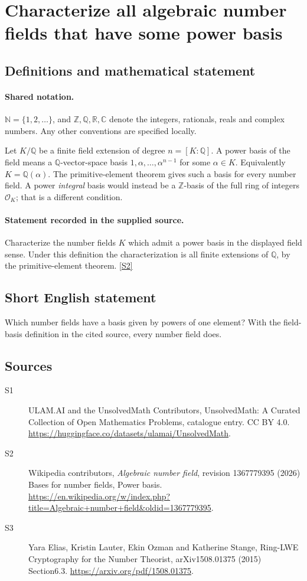 \documentclass[11pt]{article}
\newcommand{\sref}[2]{\hyperlink{source:#1:#2}{[S#2]}}
\begin{document}
\section{Characterize all algebraic number fields that have some power basis}\label{statement}

\subsection{Definitions and mathematical statement}

\paragraph{Shared notation.}$\mathbb N=\{1,2,\ldots\}$, and $\mathbb Z,\mathbb Q,\mathbb R,\mathbb C$ denote the integers, rationals, reals and complex numbers. Any other conventions are specified locally.


Let $K/\mathbb Q$ be a finite field extension of degree $n=[K:\mathbb Q]$. A power basis of the field means a $\mathbb Q$-vector-space basis $1,\alpha,\ldots,\alpha^{n-1}$ for some $\alpha\in K$. Equivalently $K=\mathbb Q(\alpha)$. The primitive-element theorem gives such a basis for every number field. A power \emph{integral} basis would instead be a $\mathbb Z$-basis of the full ring of integers $\mathcal O_K$; that is a different condition.
\paragraph{Statement recorded in the supplied source.}
Characterize the number fields $K$ which admit a power basis in the displayed field sense. Under this definition the characterization is all finite extensions of $\mathbb Q$, by the primitive-element theorem. \sref{statement}{2}
\subsection{Short English statement}
Which number fields have a basis given by powers of one element? With the field-basis definition in the cited source, every number field does.
\subsection{Sources}
\begin{description}
\item[\hypertarget{source:statement:1}{S1}] ULAM.AI and the UnsolvedMath Contributors, UnsolvedMath: A Curated Collection of Open Mathematics Problems, catalogue entry. CC BY 4.0. \url{https://huggingface.co/datasets/ulamai/UnsolvedMath}.
\item[\hypertarget{source:statement:2}{S2}] Wikipedia contributors, \emph{Algebraic number field}, revision 1367779395 (2026) Bases for number fields, Power basis. \url{https://en.wikipedia.org/w/index.php?title=Algebraic+number+field&oldid=1367779395}.
\item[\hypertarget{source:statement:3}{S3}] Yara Elias, Kristin Lauter, Ekin Ozman and Katherine Stange, Ring-LWE Cryptography for the Number Theorist, arXiv1508.01375 (2015) Section6.3. \url{https://arxiv.org/pdf/1508.01375}.
\end{description}
\label{end:statement}
\end{document}
